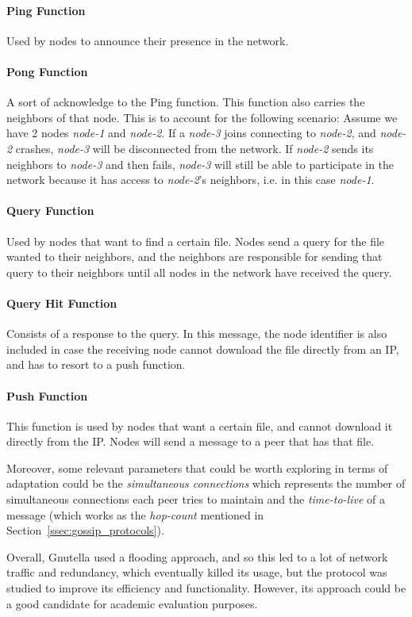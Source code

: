 \paragraph{Ping Function} Used by nodes to announce their presence in the network.
\paragraph{Pong Function} A sort of acknowledge to the Ping function. This function also carries the neighbors of that node. This is to account for the following scenario: Assume we have 2 nodes \textit{node-1} and \textit{node-2}. If a \textit{node-3} joins connecting to \textit{node-2}, and \textit{node-2} crashes, \textit{node-3} will be disconnected from the network. If \textit{node-2} sends its neighbors to \textit{node-3} and then fails, \textit{node-3} will still be able to participate in the network because it has access to \textit{node-2}'s neighbors, i.e. in this case \textit{node-1}.
\paragraph{Query Function} Used by nodes that want to find a certain file. Nodes send a query for the file wanted to their neighbors, and the neighbors are responsible for sending that query to their neighbors until all nodes in the network have received the query.
\paragraph{Query Hit Function} Consists of a response to the query. In this message, the node identifier is also included in case the receiving node cannot download the file directly from an IP, and has to resort to a push function.
\paragraph{Push Function} This function is used by nodes that want a certain file, and cannot download it directly from the IP. Nodes will send a message to a peer that has that file.
\par Moreover, some relevant parameters that could be worth exploring in terms of adaptation could be the \textit{simultaneous connections} which represents the number of simultaneous connections each peer tries to maintain and the \textit{time-to-live} of a message (which works as the \textit{hop-count} mentioned in Section~\ref{ssec:gossip_protocols}).%
\par Overall, Gnutella used a flooding approach, and so this led to a lot of network traffic and redundancy, which eventually killed its usage, but the protocol was studied to improve its efficiency and functionality. However, its approach could be a good candidate for academic evaluation purposes. %
%
%
%
